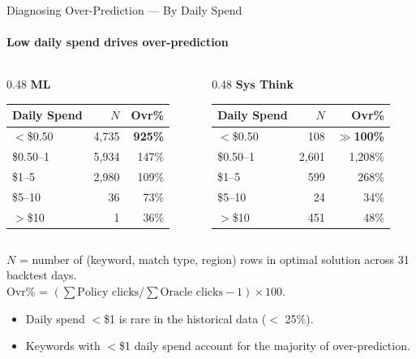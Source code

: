 \documentclass[smaller]{beamer}
\begin{document}
\begin{frame}{Diagnosing Over-Prediction --- By Daily Spend}
\framesubtitle{Low daily spend drives over-prediction}

\begin{columns}[T]
\begin{column}{0.48\textwidth}
\centering
\textbf{ML}
\smallskip

\begin{tabular}{lrr}
\toprule
Daily Spend & $N$ & Ovr\% \\
\midrule
$<$\$0.50  & 4,735 & \textbf{925\%} \\
\$0.50--1  & 5,934 & 147\% \\
\$1--5     & 2,980 & 109\% \\
\$5--10    &    36 & 73\% \\
$>$\$10    &     1 & 36\% \\
\bottomrule
\end{tabular}
\end{column}
\begin{column}{0.48\textwidth}
\centering
\textbf{Sys Think}
\smallskip

\begin{tabular}{lrr}
\toprule
Daily Spend & $N$ & Ovr\% \\
\midrule
$<$\$0.50  &   108 & \textbf{$\gg$100\%} \\
\$0.50--1  & 2,601 & 1,208\% \\
\$1--5     &   599 & 268\% \\
\$5--10    &    24 & 34\% \\
$>$\$10    &   451 & 48\% \\
\bottomrule
\end{tabular}
\end{column}
\end{columns}

\medskip
{\scriptsize $N$ = number of (keyword, match type, region) rows in optimal solution across 31 backtest days.\\
Ovr\% = $(\sum\text{Policy clicks}/\sum\text{Oracle clicks} - 1)\times 100$.}

\medskip
\begin{itemize}
    \item Daily spend $<$\$1 is rare in the historical data ($<$ 25\%).
    \item Keywords with $<$\$1 daily spend account for the majority of over-prediction.
\end{itemize}

\end{frame}
\end{document}
